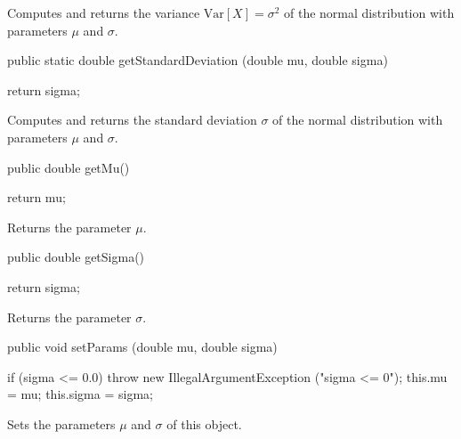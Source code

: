 \begin{tabb}  Computes and returns the variance $\mbox{Var}[X] = \sigma^2$ of the
   normal distribution with parameters $\mu$ and $\sigma$.
\end{tabb}
\begin{htmlonly}
\end{htmlonly}
\begin{code}

   public static double getStandardDeviation (double mu, double sigma)\begin{hide} {
      return sigma;
   }\end{hide}
\end{code}
\begin{tabb}  Computes and returns the standard deviation $\sigma$ of the
   normal distribution with parameters $\mu$ and $\sigma$.
\end{tabb}
\begin{htmlonly}
\end{htmlonly}
\begin{code}

   public double getMu()\begin{hide} {
      return mu;
   }\end{hide}
\end{code}
  \begin{tabb} Returns the parameter $\mu$.
  \end{tabb}
\begin{code}

   public double getSigma()\begin{hide} {
      return sigma;
   }\end{hide}
\end{code}
\begin{tabb} Returns the parameter $\sigma$.
\end{tabb}
\begin{code}

   public void setParams (double mu, double sigma)\begin{hide} {
      if (sigma <= 0.0)
         throw new IllegalArgumentException ("sigma <= 0");
      this.mu = mu;
      this.sigma = sigma;
   }\end{hide}
\end{code}
  \begin{tabb} Sets the parameters $\mu$ and $\sigma$ of this object.
  \end{tabb}
